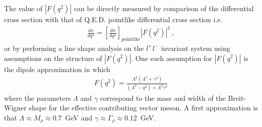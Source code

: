   The value of $\left|F(q^2)\right|$ can be directly measured by comparison of the differential cross section with that of Q.E.D. pointlike differential cross section i.e.
  \begin{align}
  \frac{d\sigma}{dq^{2}} = \left[\frac{d\sigma}{dq^{2}}\right]_{\text{pointlike}}\left| F(q^{2})\right| ^{2}\nonumber \ ,
  \end{align}
  or by performing a line shape analysis on the $l^{+}l^{-}$ invariant system using assumptions on the structure of $\left|F(q^2)\right|$. One such assumption for $\left|F(q^2)\right|$ is the dipole approximation in which 
  \begin{align}
  F(q^{2}) = \frac{\Lambda^2(\Lambda^2 + \gamma^2)}{(\Lambda^{2} - q^2) + \Lambda^2\gamma^2 } \nonumber
  \end{align}
  where the parameters $\Lambda$ and $\gamma$ correspond to the mass and width of the Breit-Wigner shape for the effective contributing vector meson. A first approximation is that $\Lambda \approx M_{\rho} \approx 0.7$~GeV and $\gamma \approx \Gamma_{\rho}  \approx 0.12$~GeV.
 
